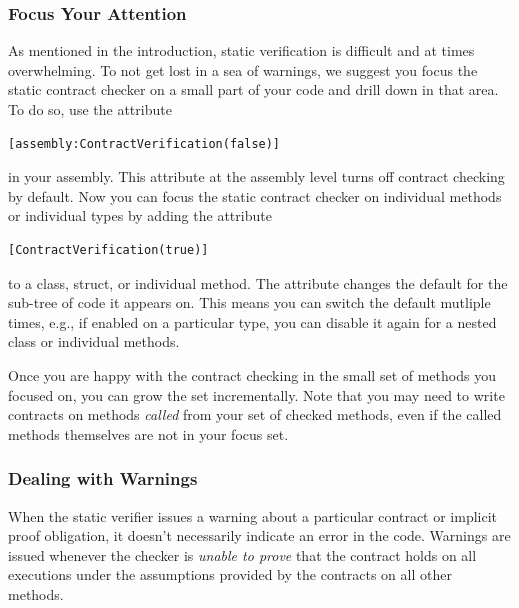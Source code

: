 \documentclass{article}
\begin{document}
\subsubsection{Focus Your Attention}
As mentioned in the introduction, static verification is difficult and
at times overwhelming. To not get lost in a sea of warnings, we
suggest you focus the static contract checker on a small part of your code and
drill down in that area. To do so, use the attribute
\begin{lstlisting}
[assembly:ContractVerification(false)]
\end{lstlisting}
in your assembly. This attribute at the assembly level turns off
contract checking by default. Now you can focus the static contract checker on
individual methods or individual types by adding the attribute
\begin{lstlisting}
[ContractVerification(true)]
\end{lstlisting}
to a class, struct, or individual method. The attribute changes the
default for the sub-tree of code it appears on. This means you can
switch the default mutliple times, e.g., if enabled on a particular
type, you can disable it again for a
nested class or individual methods.

Once you are happy with the contract checking in the small set of methods you
focused on, you can grow the set incrementally. Note that you may need
to write contracts on methods \emph{called} from your set of checked
methods, even if the called methods themselves are not in your focus
set.


\subsubsection{Dealing with Warnings}
When the static verifier issues a warning about a particular contract
or implicit proof obligation, it doesn't necessarily indicate an error
in the code. Warnings are issued whenever the checker is \emph{unable
to prove} that the contract holds on all executions under the
assumptions provided by the contracts on all other methods. 
\end{document}
